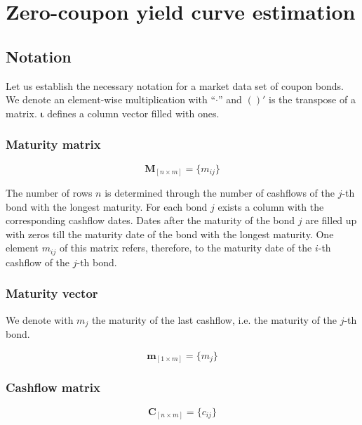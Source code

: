 \section{Zero-coupon yield curve estimation}

\subsection{Notation}
\label{sec:notation}

Let us establish the necessary notation for a market data set of coupon bonds. We denote an element-wise multiplication with ``$\cdot$'' and $( )'$ is the transpose of a matrix. $\bm{\iota}$ defines a column vector filled with ones.

\subsubsection*{Maturity matrix}

\begin{equation*}\label{maturitym}
\bm{M}_{\left[n\times m\right]}= \{m_{ij}\}
\end{equation*}

The number of rows $n$ is determined through the number of cashflows of the $j$-th bond with the longest maturity. For each bond $j$ exists a column with the corresponding cashflow dates. Dates after the maturity of the bond $j$ are filled up with zeros till the maturity date of the bond with the longest maturity. One element $m_{ij}$ of this matrix refers, therefore, to the maturity date of the $i$-th cashflow of the $j$-th bond. 

\subsubsection*{Maturity vector}

We denote with $m_j$ the maturity of the last cashflow, i.e. the maturity of the $j$-th bond.

\begin{equation*}\label{weights}
    \bm{m}_{\left[1\times m\right]}= \{m_j\}
\end{equation*}

\subsubsection*{Cashflow matrix}


 \begin{equation*}\label{cashflowm}
\bm{C}_{\left[n\times m\right]}= \{c_{ij}\}
\end{equation*}

